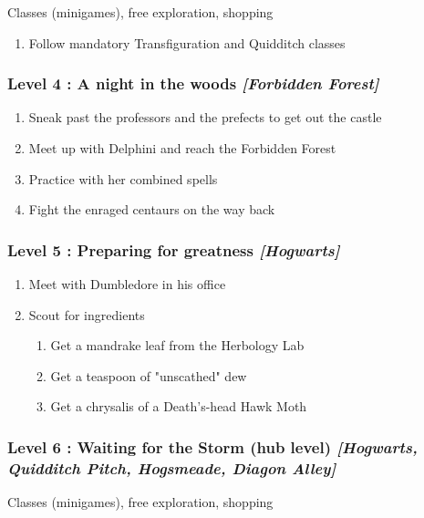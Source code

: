 Classes (minigames), free exploration, shopping
\begin{enumerate}[1)]
	\item Follow mandatory Transfiguration and Quidditch classes
\end{enumerate}

\subsubsection*{Level 4 : A night in the woods \textit{[Forbidden Forest]}}
\begin{enumerate}[1)]
	\item Sneak past the professors and the prefects to get out the castle
	\item Meet up with Delphini and reach the Forbidden Forest
	\item Practice with her combined spells
	\item Fight the enraged centaurs on the way back
\end{enumerate}

\subsubsection*{Level 5 : Preparing for greatness \textit{[Hogwarts]}}
\begin{enumerate}[1)]
	\item Meet with Dumbledore in his office
	\item Scout for ingredients
	\begin{enumerate}[1.]
		\item Get a mandrake leaf from the Herbology Lab
		\item Get a teaspoon of "unscathed" dew
		\item Get a chrysalis of a Death's-head Hawk Moth
	\end{enumerate}
\end{enumerate}

\subsubsection*{Level 6 : Waiting for the Storm (hub level) \textit{[Hogwarts, Quidditch Pitch, Hogsmeade, Diagon Alley]}}

Classes (minigames), free exploration, shopping

